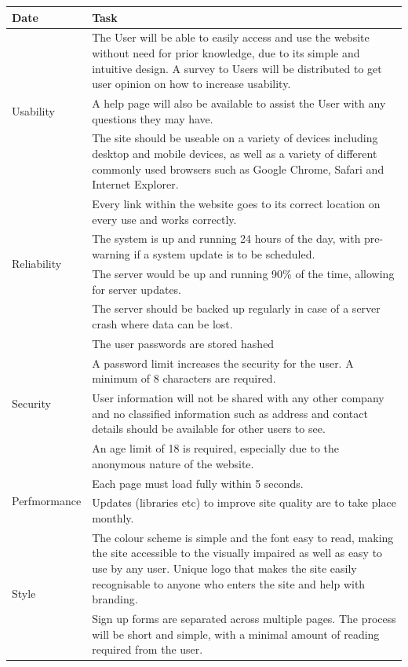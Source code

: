 \documentclass[12pt]{article}
\begin{document}
\begin{table}[ht!]
    \centering
    \begin{tabular}{|p{2.5cm}|p{12cm}|}
        \hline
        Date & Task\\
        \hline
        \multirow{3}{2.5cm}{Usability} & The User will be able to easily access
        and use the website without need for prior knowledge, due to its simple
        and intuitive design. A survey to Users will be distributed to get user
        opinion on how to increase usability.\\
        \cline{2-2}
        & A help page will also be available to assist the User with any questions they may have. \\
        \cline{2-2}
        & The site should be useable on a variety of devices including desktop
        and mobile devices, as well as a variety of different commonly used
        browsers such as Google Chrome, Safari and Internet Explorer.\\
        \hline
        \multirow{4}{2.5cm}{Reliability} & Every link within the website goes to
        its correct location on every use and works correctly.\\
        \cline{2-2}
        & The system is up and running 24 hours of the day, with pre-warning if
        a system update is to be scheduled.\\
        \cline{2-2}
        & The server would be up and running 90\% of the time, allowing for
        server updates.\\
        \cline{2-2}
        & The server should be backed up regularly in case of a server crash
        where data can be lost.\\
        \hline
        \multirow{4}{2.5cm}{Security} & The user passwords are stored hashed\\
        & A password limit increases the security for the user. A minimum of 8
        characters are required.\\
        \cline{2-2}
        & User information will not be shared with any other company and no
        classified information such as address and contact details should be
        available for other users to see.\\
        \cline{2-2}
        & An age limit of 18 is required, especially due to the anonymous
        nature of the website.\\
        \hline
        \multirow{2}{2.5cm}{Perfmormance} & Each page must load fully within 5 seconds.\\
        & Updates (libraries etc) to improve site quality are to take place monthly.\\
        \hline
        \multirow{2}{2.5cm}{Style} & The colour scheme is simple and the font
        easy to read, making the site accessible to the visually impaired as
        well as easy to use by any user. Unique logo that makes the site easily
        recognisable to anyone who enters the site and help with branding.\\
        \cline{2-2}
        & Sign up forms are separated across multiple pages. The process will
	be short and simple, with a minimal amount of reading required from the
	user.\\
        \hline


\end{tabular}
\end{table}
\end{document}
